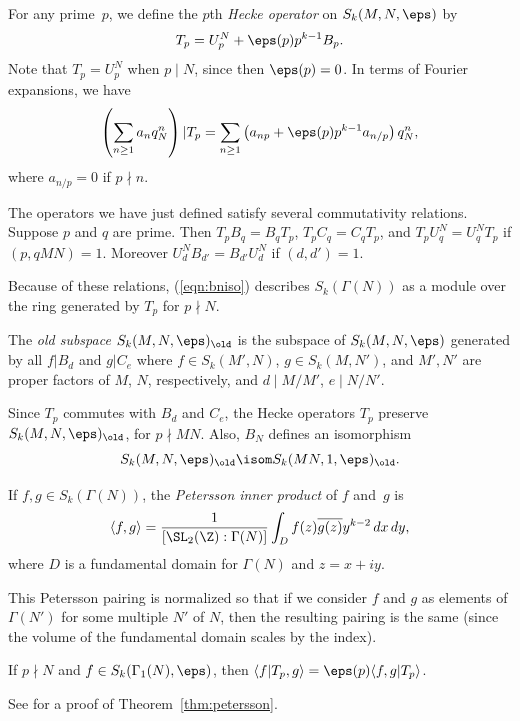 \documentclass{report}
\begin{document}
For any prime~$p$, we define the $p$th {\em Hecke operator}
on $S_k(M,N,\eps)$ by
\[
   T_p = U_p^N + \eps(p) p^{k-1} B_p.
\]
Note that $T_p=U_p^N$ when $p\mid N$, since then $\eps(p)=0$.
In terms of Fourier expansions, we have
\[
   \left(\sum_{n \geq 1} a_n q_N^n\right)|T_p = \sum_{n\geq 1} \left(
    a_{np} + \eps(p) p^{k-1} a_{n/p}\right) q_N^n,
\]
where $a_{n/p}=0$ if $p\nmid n$.

The operators we have just defined satisfy several commutativity relations.
Suppose $p$ and $q$ are prime. Then $T_p B_q = B_q T_p$, $T_p C_q
= C_q T_p$, and $T_p U_q^N = U_q^N T_p$ if $(p,qMN)=1$.  Moreover
$U_d^N B_{d'} = B_{d'} U_d^N$ if $(d,d')=1$.

\begin{remark}
  Because of these relations, (\ref{eqn:bniso}) describes
  $S_k(\Gamma(N))$ as a module over the ring generated by $T_p$ for
  $p\nmid N$.
\end{remark}


\begin{definition}
The {\em old subspace} $S_k(M,N,\eps)_{\old}$ is the subspace of
$S_k(M,N,\eps)$ generated by all $f|B_d$ and $g|C_{e}$ where $f\in
S_k(M',N)$, $g\in S_k(M,N')$, and $M', N'$ are proper factors of
$M$, $N$, respectively, and $d\mid M/M'$, $e\mid N/N'$.
\end{definition}

Since $T_p$ commutes with $B_d$ and $C_e$, the Hecke operators
$T_p$ preserve $S_k(M,N,\eps)_{\old}$, for $p\nmid MN$.
Also, $B_N$ defines an isomorphism
\[
  S_k(M,N,\eps)_{\old} \isom S_k(MN,1,\eps)_{\old}.
\]

\begin{definition}
If $f, g\in S_k(\Gamma(N))$, the {\em Petersson inner product} of
$f$ and~$g$ is
\[
   \langle f, g\rangle =
      \frac{1}{[\SL_2(\Z) : \Gamma(N)]} \int_{D}
         f(z)\overline{g(z)} y^{k-2}\, dx\, dy,
\]
where $D$ is a fundamental domain for $\Gamma(N)$ and $z=x+ i y$.
\end{definition}
This Petersson pairing is normalized so that if we consider $f$ and $g$ as
elements of $\Gamma(N')$ for some multiple $N'$ of $N$, then the
resulting pairing is the same (since the volume of the fundamental domain
scales by the index).

\begin{theorem}[Petersson]\label{thm:petersson}
If $p\nmid N$ and $f\in S_k(\Gamma_1(N),\eps)$, then $\langle
f|T_p, g \rangle = \eps(p)\langle f, g|T_p\rangle$.
\end{theorem}
See \cite[\S{}VII.5, Thm.~5.1]{lang:modular} for a proof of Theorem~\ref{thm:petersson}.
\end{document}
